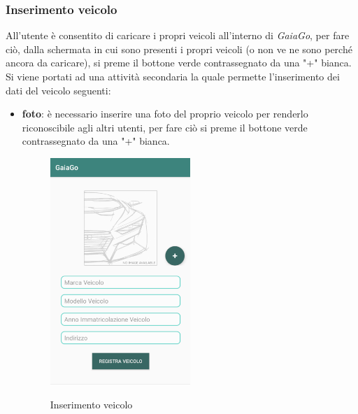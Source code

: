 \subsubsection{Inserimento veicolo}
All'utente è consentito di caricare i propri veicoli all'interno di \textit{GaiaGo}, per fare ciò, dalla schermata in cui sono presenti i propri veicoli (o non ve ne sono perché ancora da caricare), si preme il bottone verde contrassegnato da una "+" bianca.
Si viene portati ad una attività secondaria la quale permette l'inserimento dei dati del veicolo seguenti:
\begin{itemize}
	\item \textbf{foto}: è necessario inserire una foto del proprio veicolo per renderlo riconoscibile agli altri utenti, per fare ciò si preme il bottone verde contrassegnato da una "+" bianca.
	 \begin{figure}[H] 
		\centering 
		\includegraphics[width=0.5\textwidth]{res/images/caricamento_veicolo.png}\\
		\caption{Inserimento veicolo}
		\label{ins}
	\end{figure}
\pagebreak


\end{itemize}
